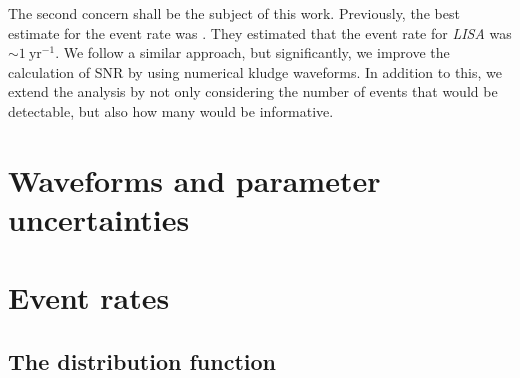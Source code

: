 \documentclass[useAMS,usedcolumn,usegraphicx,usenatbib]{mn2e}
\newcommand{\units}[1]{\ensuremath{~\mathrm{#1}}}
\begin{document}
The second concern shall be the subject of this work. Previously, the best estimate for the event rate was \citet*{Hopman2007}. They estimated that the event rate for \textit{LISA} was $\sim 1\units{yr^{-1}}$. We follow a similar approach, but significantly, we improve the calculation of SNR by using numerical kludge waveforms. In addition to this, we extend the analysis by not only considering the number of events that would be detectable, but also how many would be informative.

\section{Waveforms and parameter uncertainties}



\section{Event rates}

\subsection{The distribution function}
\end{document}
